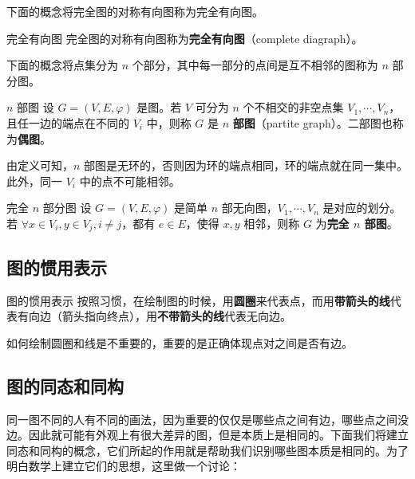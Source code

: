 下面的概念将完全图的对称有向图称为完全有向图。
\begin{definition}{完全有向图}
完全图的对称有向图称为\textbf{完全有向图}（complete diagraph）。
\end{definition}

下面的概念将点集分为 $n$ 个部分，其中每一部分的点间是互不相邻的图称为 $n$ 部分图。
\begin{definition}{$n$ 部图}
设 $G=(V,E,\varphi)$ 是图。若 $V$ 可分为 $n$ 个不相交的非空点集 $V_1,\cdots,V_n$，且任一边的端点在不同的 $V_i$ 中，则称 $G$ 是 $n$ \textbf{部图}（partite graph）。二部图也称为\textbf{偶图}。
\end{definition}
由定义可知，$n$ 部图是无环的，否则因为环的端点相同，环的端点就在同一集中。此外，同一 $V_i$ 中的点不可能相邻。

\begin{definition}{完全 $n$ 部分图}
设 $G=(V,E,\varphi)$ 是简单 $n$ 部无向图，$V_1,\cdots,V_n$ 是对应的划分。若 $\forall x\in V_i,y\in V_j,i\neq j$，都有 $e\in E$，使得 $x,y$ 相邻，则称 $G$ 为\textbf{完全 $n$ 部图}。
\end{definition}



\subsection{图的惯用表示}

\begin{definition}{图的惯用表示}
按照习惯，在绘制图的时候，用\textbf{圆圈}来代表点，而用\textbf{带箭头的线}代表有向边（箭头指向终点），用\textbf{不带箭头的线}代表无向边。
\end{definition}
如何绘制圆圈和线是不重要的，重要的是正确体现点对之间是否有边。
\subsection{图的同态和同构}



同一图不同的人有不同的画法，因为重要的仅仅是哪些点之间有边，哪些点之间没边。因此就可能有外观上有很大差异的图，但是本质上是相同的。下面我们将建立同态和同构的概念，它们所起的作用就是帮助我们识别哪些图本质是相同的。为了明白数学上建立它们的思想，这里做一个讨论：

